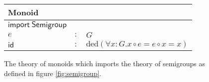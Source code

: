 \begin{figure}[h]
  \begin{center}
    \begin{tabular}{|l c l|}
      \hline
      \textsf{Monoid} & &\\\hline
      $ \mathsf{import \ Semigroup}$ &&\\
      \hline
      $e$ & $:$ & $G$\\
      $ \mathsf{id}$& $:$ & $ \text{ded}\left( \forall x : G . x\circ e = e \circ x = x\right)$\\\hline
    \end{tabular}
  \end{center}
  \caption{The theory of monoids which imports the theory of semigroups as defined in figure \ref{fig:semigroup}. }
  \label{fig:monoid}
\end{figure}
